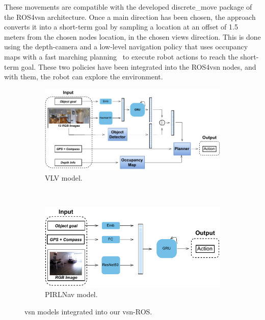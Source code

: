 These movements are compatible with the developed discrete\_move package of the ROS4\acrshort{vsn} architecture.
Once a main direction has been chosen, the approach converts it into a short-term goal by sampling a location at an offset of 1.5 meters from the chosen node\textquotesingle s location, in the chosen view\textquotesingle s direction.
This is done using the depth-camera and a low-level navigation policy that uses occupancy maps with a fast marching planning~\cite{Sethian1996} to execute robot actions to reach the short-term goal.
These two policies have been integrated into the ROS4\acrshort{vsn} nodes, and with them, the robot can explore the environment.

\begin{figure}
    \centering
    \begin{subfigure}[b]{\textwidth}
        \includegraphics[width=\textwidth]{figures/ros4vsn/vlv_diagram}
        \caption{VLV model.}
        \label{fig:vlv_overview}
    \end{subfigure}
    ~
    \begin{subfigure}[b]{\textwidth}
        \includegraphics[width=\textwidth]{figures/ros4vsn/pirlnav_diagram}
        \caption{PIRLNav model.}
        \label{fig:pirlnav_overview}
    \end{subfigure}
    \caption{\acrshort{vsn} models integrated into our \acrshort{vsn}-ROS.}\label{fig:vsn_models_overview}
\end{figure}

